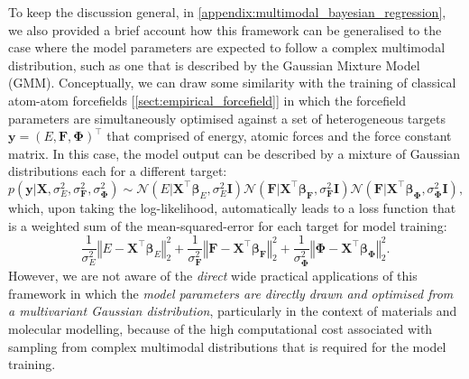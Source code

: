 To keep the discussion general, in \cref{appendix:multimodal_bayesian_regression}, we also provided a brief account how this framework can be generalised to the case where the model parameters are expected to follow a complex multimodal distribution, such as one that is described by the Gaussian Mixture Model (GMM). Conceptually, we can draw some similarity with the training of classical atom-atom forcefields [\cref{sect:empirical_forcefield}] in which the forcefield parameters are simultaneously optimised against a set of heterogeneous targets $\bm{y}=(E,\mathbf{F},\boldsymbol{\Phi})^\top$ that comprised of energy, atomic forces and the force constant matrix.\cite{grimme2014general,rohskopf2017empirical} In this case, the model output can be described by a mixture of Gaussian distributions each for a different target: 
\begin{equation*}
p(\bm{y}\vert \bm{X},\sigma_E^2,\sigma_{\bm{F}}^2,\sigma_{\boldsymbol{\Phi}}^2)\sim\mathcal{N}\left(E|\bm{X}^\top\boldsymbol{\beta}_E,\sigma_E^2\bm{I}\right)\mathcal{N}\left(\bm{F}|\bm{X}^\top\boldsymbol{\beta}_{\bm{F}},\sigma_\bm{F}^2\bm{I}\right)\mathcal{N}\left(\bm{F}|\bm{X}^\top\boldsymbol{\beta}_{\boldsymbol{\Phi}},\sigma_{\boldsymbol{\Phi}}^2\bm{I}\right),
\end{equation*}
which, upon taking the log-likelihood, automatically leads to a loss function that is a weighted sum of the mean-squared-error for each target for model training:
\begin{equation*}
    \frac{1}{\sigma_E^2}\left\Vert E-\bm{X}^\top\boldsymbol{\beta}_E\right\Vert^2_2+\frac{1}{\sigma_\bm{F}^2}\left\Vert \bm{F}-\bm{X}^\top\boldsymbol{\beta}_{\bm{F}}\right\Vert^2_2+\frac{1}{\sigma_{\boldsymbol{\Phi}}^2}\left\Vert \boldsymbol{\Phi}-\bm{X}^\top\boldsymbol{\beta}_{\boldsymbol{\Phi}}\right\Vert^2_2.
\end{equation*}
However, we are not aware of the \emph{direct} wide practical applications of this framework in which the \emph{model parameters are directly drawn and optimised from a multivariant Gaussian distribution}, particularly in the context of materials and molecular modelling, because of the high computational cost associated with sampling from complex multimodal distributions that is required for the model training. 

